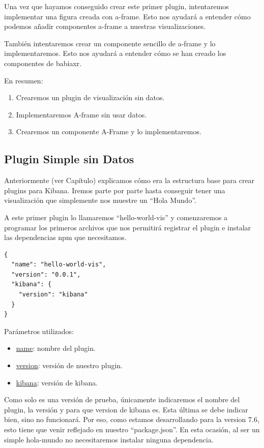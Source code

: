\documentclass[a4paper, 12pt]{book}
\begin{document}
Una vez que hayamos conseguido crear este primer plugin, intentaremos implementar una figura creada con a-frame. Esto nos ayudará a entender cómo podemos añadir componentes a-frame a nuestras visualizaciones.

También intentaremos crear un componente sencillo de a-frame y lo implementaremos. Esto nos ayudará a entender cómo se han creado los componentes de babiaxr.

En resumen:
\begin{enumerate}
    \item Crearemos un plugin de visualización sin datos.
    \item Implementaremos A-frame sin usar datos.
    \item Crearemos un componente A-Frame y lo implementaremos.
\end{enumerate}

\subsection{Plugin Simple sin Datos}
Anteriormente (ver Capítulo) explicamos cómo era la estructura base para crear plugins para Kibana. Iremos parte por parte hasta conseguir tener una visualización que simplemente nos muestre un “Hola Mundo”.

A este primer plugin lo llamaremos “hello-world-vis” y comenzaremos a programar los primeros archivos que nos permitirá registrar el plugin e instalar las dependencias npm que necesitamos.

\begin{lstlisting}[frame=single]
{
  "name": "hello-world-vis",
  "version": "0.0.1",
  "kibana": {
    "version": "kibana"
  }
}
\end{lstlisting}

Parámetros utilizados:
\begin{itemize}
    \item \underline{name}: nombre del plugin.
    \item \underline{version}: versión de nuestro plugin.
    \item \underline{kibana}: versión de kibana.
\end{itemize}

Como solo es una versión de prueba, únicamente indicaremos el nombre del plugin, la versión y para que version de kibana es. Esta última se debe indicar bien, sino no funcionará. Por eso, como estamos desarrollando para la version 7.6, esto tiene que venir reflejado en nuestro “package.json”. En esta ocasión, al ser un simple hola-mundo no necesitaremos instalar ninguna dependencia.
\end{document}
